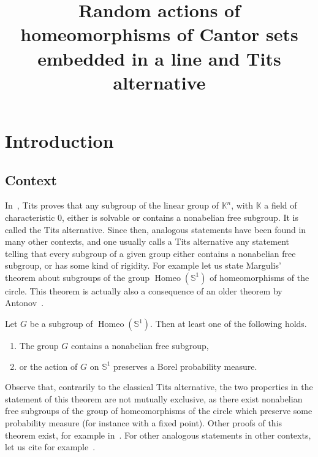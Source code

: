 \documentclass[AHL,Unicode,longabstracts,published]{cedram}
\title[Random actions of homeomorphisms of Cantor sets]{Random actions of homeomorphisms of Cantor sets embedded in a line and Tits alternative}
\author[\initial{D.} \lastname{Malicet}]{\firstname{Dominique} \lastname{Malicet}}
\author[\initial{E.} \lastname{Militon}]{\firstname{Emmanuel} \lastname{Militon}}
\DeclareMathOperator{\Homeo}{Homeo}
\newcommand{\bbK}{\mathbb{K}}
\newcommand{\bbS}{\mathbb{S}}
\begin{document}
\maketitle






\section{Introduction}

\subsection{Context}

In~\cite{Tits}, Tits proves that any subgroup of the linear group of $\bbK^n$, with $\bbK$ a field of characteristic $0$, either is solvable or contains a nonabelian free subgroup. It is called the Tits alternative. Since then, analogous statements have been found in many other contexts, and one usually calls a Tits alternative any statement telling that every subgroup of a given group either contains a nonabelian free subgroup, or has some kind of rigidity. For example let us state Margulis' theorem about subgroups of the group $\Homeo(\bbS^1)$ of homeomorphisms of the circle. This theorem is actually also a consequence of an older theorem by Antonov~\cite{Ant}.

\begin{theo}
\label{Margulis}
Let $G$ be a subgroup of $\Homeo(\bbS^1)$. Then at least one of the following holds.
\begin{enumerate}
\item\label{theo1.1.1} The group $G$ contains a nonabelian free subgroup,
\item\label{theo1.1.2} or the action of $G$ on $\bbS^1$ preserves a Borel probability measure.
\end{enumerate}
\end{theo}

Observe that, contrarily to the classical Tits alternative, the two properties in the statement of this theorem are not mutually exclusive, as there exist nonabelian free subgroups of the group of homeomorphisms of the circle which preserve some probability measure (for instance with a fixed point). Other proofs of this theorem exist, for example in~\cite{Ghys,Maly,Nav}. For other analogous statements in other contexts, let us cite for example~\cite{A,BG,HM,MC}.
\end{document}
